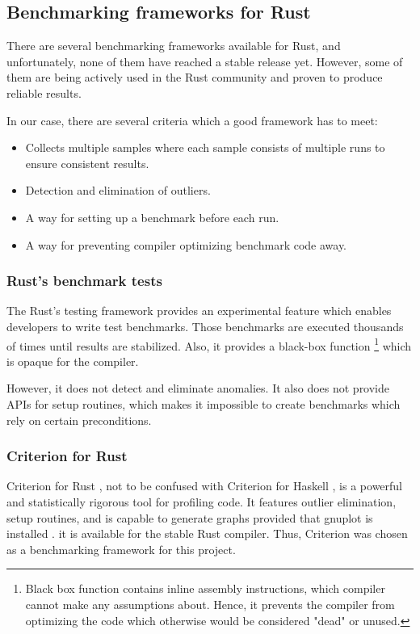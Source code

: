 \subsection{Benchmarking frameworks for Rust}
There are several benchmarking frameworks available for Rust, and unfortunately, none of them have reached a stable release yet. However, some of them are being actively used in the Rust community and proven to produce reliable results.  

In our case, there are several criteria which a good framework has to meet:
\begin{itemize}
    \item Collects multiple samples where each sample consists of multiple runs to ensure consistent results. 
    \item Detection and elimination of outliers.     
    \item A way for setting up a benchmark before each run. 
    \item A way for preventing compiler optimizing benchmark code away.     
\end{itemize}

\subsubsection*{Rust's benchmark tests}
The Rust's testing framework provides an experimental feature which enables developers to write test benchmarks. Those benchmarks are executed thousands of times until results are stabilized. Also, it provides a black-box function \footnote{Black box function contains inline assembly instructions, which compiler cannot make any assumptions about. Hence, it prevents the compiler from optimizing the code which otherwise would be considered "dead" or unused.} which is opaque for the compiler. 

However, it does not detect and eliminate anomalies. It also does not provide APIs for setup routines, which makes it impossible to create benchmarks which rely on certain preconditions.

\subsubsection*{Criterion for Rust}
Criterion for Rust , not to be confused with Criterion for Haskell , is a powerful and statistically rigorous tool for profiling code. It features outlier elimination, setup routines, and is capable to generate graphs provided that gnuplot is installed . it is available for the stable Rust compiler. Thus, Criterion was chosen as a benchmarking framework for this project. 

